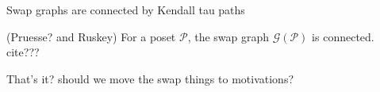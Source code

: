 \documentclass[12pt]{llncs}
\let\oldleq\leq
\renewcommand{\leq}[1][]{\oldleq_{#1}}
\newcommand{\poset}[1]{\mathcal{#1}}
\begin{document}
\begin{theorem}
    Swap graphs are connected by Kendall tau paths
\end{theorem}

\begin{theorem}
    \label{theorem:szpilrajn}
\end{theorem}

\begin{theorem}
    (Pruesse? and Ruskey) For a poset $\poset{P}$, the swap graph $\mathcal{G}(\poset{P})$ is connected. cite???
\end{theorem}

That's it? should we move the swap things to motivations?
\end{document}

